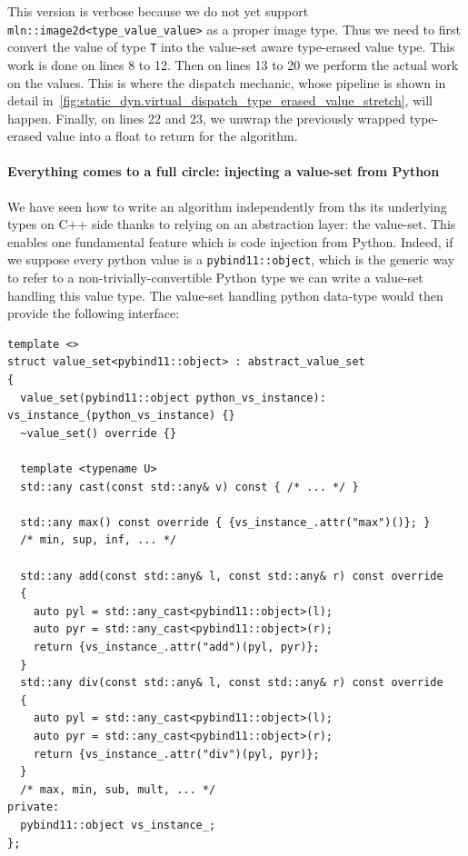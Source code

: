 This version is verbose because we do not yet support \texttt{mln::image2d<type\_value\_value>} as a proper image type.
Thus we need to first convert the value of type \texttt{T} into the value-set aware type-erased value type. This work is
done on lines 8 to 12. Then on lines 13 to 20 we perform the actual work on the values. This is where the dispatch
mechanic, whose pipeline is shown in detail in~\cref{fig:static_dyn.virtual_dispatch_type_erased_value_stretch}, will
happen. Finally, on lines 22 and 23, we unwrap the previously wrapped type-erased value into a float to return for the
algorithm.


\paragraph{Everything comes to a full circle: injecting a value-set from Python}

We have seen how to write an algorithm independently from ths its underlying types on C++ side thanks to relying on an
abstraction layer: the value-set. This enables one fundamental feature which is code injection from Python. Indeed, if
we suppose every python value is a \texttt{pybind11::object}, which is the generic way to refer to a
non-trivially-convertible Python type we can write a value-set handling this value type. The value-set handling python
data-type would then provide the following interface:

\begin{verbatim}
template <>
struct value_set<pybind11::object> : abstract_value_set
{
  value_set(pybind11::object python_vs_instance): vs_instance_(python_vs_instance) {}
  ~value_set() override {}

  template <typename U>
  std::any cast(const std::any& v) const { /* ... */ }

  std::any max() const override { {vs_instance_.attr("max")()}; }
  /* min, sup, inf, ... */

  std::any add(const std::any& l, const std::any& r) const override
  {
    auto pyl = std::any_cast<pybind11::object>(l);
    auto pyr = std::any_cast<pybind11::object>(r);
    return {vs_instance_.attr("add")(pyl, pyr)};
  }
  std::any div(const std::any& l, const std::any& r) const override
  {
    auto pyl = std::any_cast<pybind11::object>(l);
    auto pyr = std::any_cast<pybind11::object>(r);
    return {vs_instance_.attr("div")(pyl, pyr)};
  }
  /* max, min, sub, mult, ... */
private:
  pybind11::object vs_instance_;
};
\end{verbatim}

